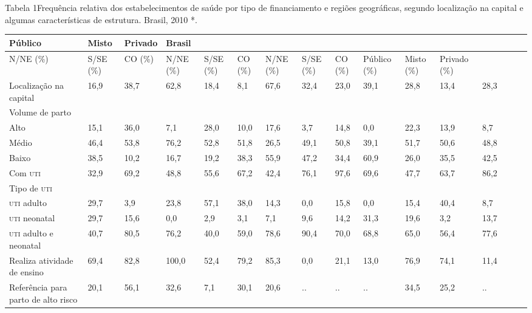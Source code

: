 \documentclass{article}
\begin{document}
Tabela 1Frequência relativa dos estabelecimentos de saúde por tipo de
financiamento e regiões geográficas, segundo localização na capital e
algumas características de estrutura. Brasil, 2010 *.
\begin{table}
\begin{xtabular}{ l | l | l | l l | l | l | l | l | l | l | l | l | l | l | l }
\hline
Público & Misto & Privado & Brasil\\ \hline
N/NE (\%) & S/SE (\%) & CO (\%) & N/NE (\%) & S/SE (\%) & CO (\%) & N/NE (\%) &
S/SE (\%) & CO (\%) & Público (\%) & Misto (\%) & Privado (\%)\\ \hline
Localização na capital
& 16,9
& 38,7
& 62,8
& 18,4
& 8,1
& 67,6
& 32,4
& 23,0
& 39,1
& 28,8
& 13,4
& 28,3
\\ \hline

Volume de parto
&
&
&
&
&
&
&
&
&
&
&
&
\\ \hline

Alto
& 15,1
& 36,0
& 7,1
& 28,0
& 10,0
& 17,6
& 3,7
& 14,8
& 0,0
& 22,3
& 13,9
& 8,7
\\ \hline

Médio
& 46,4
& 53,8
& 76,2
& 52,8
& 51,8
& 26,5
& 49,1
& 50,8
& 39,1
& 51,7
& 50,6
& 48,8
\\ \hline

Baixo
& 38,5
& 10,2
& 16,7
& 19,2
& 38,3
& 55,9
& 47,2
& 34,4
& 60,9
& 26,0
& 35,5
& 42,5
\\ \hline

Com \textsc{uti}
& 32,9
& 69,2
& 48,8
& 55,6
& 67,2
& 42,4
& 76,1
& 97,6
& 69,6
& 47,7
& 63,7
& 86,2
\\ \hline

Tipo de \textsc{uti}
&
&
&
&
&
&
&
&
&
&
&
&
\\ \hline

\textsc{uti} adulto
& 29,7
& 3,9
& 23,8
& 57,1
& 38,0
& 14,3
& 0,0
& 15,8
& 0,0
& 15,4
& 40,4
& 8,7
\\ \hline

\textsc{uti} neonatal
& 29,7
& 15,6
& 0,0
& 2,9
& 3,1
& 7,1
& 9,6
& 14,2
& 31,3
& 19,6
& 3,2
& 13,7
\\ \hline

\textsc{uti} adulto e neonatal
& 40,7
& 80,5
& 76,2
& 40,0
& 59,0
& 78,6
& 90,4
& 70,0
& 68,8
& 65,0
& 56,4
& 77,6
\\ \hline

Realiza atividade de ensino
& 69,4
& 82,8
& 100,0
& 52,4
& 79,2
& 85,3
& 0,0
& 21,1
& 13,0
& 76,9
& 74,1
& 11,4
\\ \hline

Referência para parto de alto risco
& 20,1
& 56,1
& 32,6
& 7,1
& 30,1
& 20,6
& ..
& ..
& ..
& 34,5
& 25,2
& ..
\\ \hline

\end{xtabular}
\end{table}
\end{document}
